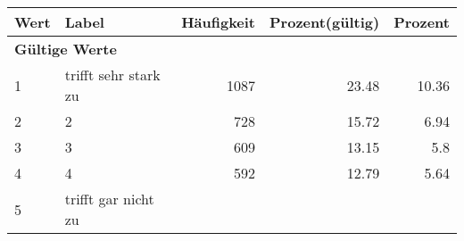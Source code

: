      \begin{longtable}{lXrrr}
     \toprule
     \textbf{Wert} & \textbf{Label} & \textbf{Häufigkeit} & \textbf{Prozent(gültig)} & \textbf{Prozent} \\
     \endhead
     \midrule
     \multicolumn{5}{l}{\textbf{Gültige Werte}}\\

     1 &
     \multicolumn{1}{X}{ trifft sehr stark zu   } &


       \num{1087} &
       \num[round-mode=places,round-precision=2]{23.48} &
         \num[round-mode=places,round-precision=2]{10.36} \\

     2 &
     \multicolumn{1}{X}{ 2   } &


       \num{728} &
       \num[round-mode=places,round-precision=2]{15.72} &
         \num[round-mode=places,round-precision=2]{6.94} \\

     3 &
     \multicolumn{1}{X}{ 3   } &


       \num{609} &
       \num[round-mode=places,round-precision=2]{13.15} &
         \num[round-mode=places,round-precision=2]{5.8} \\

     4 &
     \multicolumn{1}{X}{ 4   } &


       \num{592} &
       \num[round-mode=places,round-precision=2]{12.79} &
         \num[round-mode=places,round-precision=2]{5.64} \\

     5 &
     \multicolumn{1}{X}{ trifft gar nicht zu   } &



\end{longtable}
